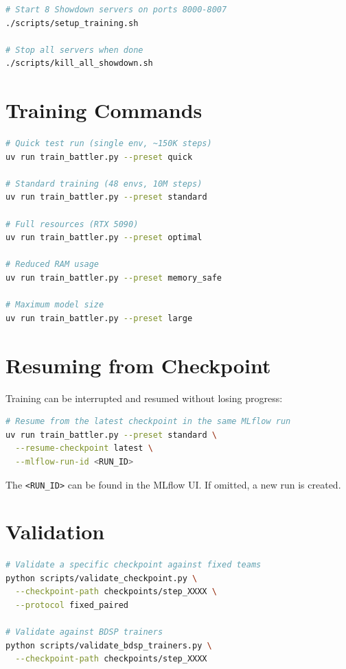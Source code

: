 \begin{lstlisting}[language=bash]
# Start 8 Showdown servers on ports 8000-8007
./scripts/setup_training.sh

# Stop all servers when done
./scripts/kill_all_showdown.sh
\end{lstlisting}

\section{Training Commands}

\begin{lstlisting}[language=bash]
# Quick test run (single env, ~150K steps)
uv run train_battler.py --preset quick

# Standard training (48 envs, 10M steps)
uv run train_battler.py --preset standard

# Full resources (RTX 5090)
uv run train_battler.py --preset optimal

# Reduced RAM usage
uv run train_battler.py --preset memory_safe

# Maximum model size
uv run train_battler.py --preset large
\end{lstlisting}

\section{Resuming from Checkpoint}

Training can be interrupted and resumed without losing progress:

\begin{lstlisting}[language=bash]
# Resume from the latest checkpoint in the same MLflow run
uv run train_battler.py --preset standard \
  --resume-checkpoint latest \
  --mlflow-run-id <RUN_ID>
\end{lstlisting}

The \texttt{<RUN\_ID>} can be found in the MLflow UI.  If omitted, a new run
is created.

\section{Validation}

\begin{lstlisting}[language=bash]
# Validate a specific checkpoint against fixed teams
python scripts/validate_checkpoint.py \
  --checkpoint-path checkpoints/step_XXXX \
  --protocol fixed_paired

# Validate against BDSP trainers
python scripts/validate_bdsp_trainers.py \
  --checkpoint-path checkpoints/step_XXXX
\end{lstlisting}

